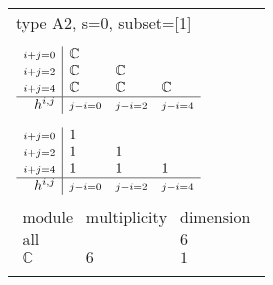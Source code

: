 \documentclass[crop,border=2mm]{standalone}
\begin{document}
\begin{tabular}{l}
{\huge type A2, s=0, subset=[1]}\\ \\


$\displaystyle
\begin{array}{r|l l l}
	{\scriptstyle i+j=0}&\mathbb{C}&&\\
	{\scriptstyle i+j=2}&\mathbb{C}&\mathbb{C}&\\
	{\scriptstyle i+j=4}&\mathbb{C}&\mathbb{C}&\mathbb{C}\\
	\hline h^{i,j}&{\scriptstyle j-i=0}&{\scriptstyle j-i=2}&{\scriptstyle j-i=4}
\end{array}
$ \\ \\


$\displaystyle
\begin{array}{r|l l l}
	{\scriptstyle i+j=0}&1&&\\
	{\scriptstyle i+j=2}&1&1&\\
	{\scriptstyle i+j=4}&1&1&1\\
	\hline h^{i,j}&{\scriptstyle j-i=0}&{\scriptstyle j-i=2}&{\scriptstyle j-i=4}
\end{array}
$ \\ \\


$\displaystyle
\begin{array}{rll}
	\text{module}&\text{multiplicity}&\text{dimension} \\ \hline \text{all}&&6 \\
	\mathbb{C}&6&1
\end{array}
$ \\ \\

\end{tabular}
\end{document}
